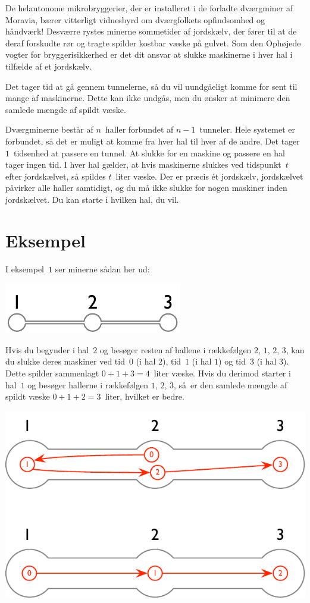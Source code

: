
\noindent
De helautonome mikrobryggerier, der er installeret i de forladte dværgminer af Moravia, bærer vitterligt vidnesbyrd om dværgfolkets opfindsomhed og håndværk!
Desværre rystes minerne sommetider af jordskælv, der fører til at de deraf forskudte rør og tragte spilder kostbar væske på gulvet.
Som den Ophøjede vogter for bryggerisikkerhed er det dit ansvar at slukke maskinerne i hver hal i tilfælde af et jordskælv.

Det tager tid at gå gennem tunnelerne,
så du vil uundgåeligt komme for sent til mange af maskinerne.
Dette kan ikke undgås, men du ønsker at minimere den samlede mængde af spildt væske.

\medskip
Dværgminerne består af $n$~haller forbundet af $n-1$~tunneler.
Hele systemet er forbundet, så det er muligt at komme fra hver hal til hver af de andre.
Det tager $1$~tidsenhed at passere en tunnel.
At slukke for en maskine og passere en hal tager ingen tid.
I hver hal gælder, at hvis maskinerne slukkes ved tidspunkt~$t$ efter jordskælvet, så spildes $t$~liter væske.
Der er præcis ét jordskælv, jordskælvet påvirker alle haller samtidigt, og du må ikke slukke for nogen maskiner inden jordskælvet.
Du kan starte i hvilken hal, du vil.



\section*{Eksempel}

I eksempel~$1$ ser minerne sådan her ud:

\includegraphics[width=.2\textwidth]{img/sample-1.pdf}

Hvis du begynder i hal~$2$ og besøger resten af hallene i rækkefølgen $2$, $1$, $2$, $3$, kan du slukke deres maskiner ved tid~$0$ (i hal $2$), tid~$1$ (i hal $1$) og tid~$3$ (i hal $3$).
Dette spilder sammenlagt $0+1+3=4$~liter væske.
Hvis du derimod starter i hal~$1$ og besøger hallerne i rækkefølgen $1$, $2$, $3$, så er den samlede mængde af spildt væske $0+1+2=3$~liter, hvilket er bedre.

\includegraphics[width=.4\textwidth]{img/sample-1-ans.pdf}

